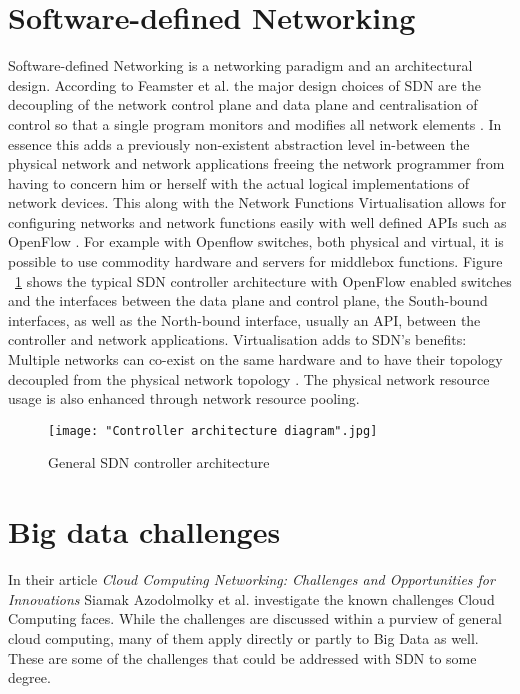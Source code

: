 \documentclass{acm_proc_article-sp}
\begin{document}
\section{Software-defined Networking}

Software-defined Networking is a networking paradigm and an architectural design. According to Feamster et al. the major design choices of SDN are the decoupling of the network control plane and data plane and centralisation of control so that a single program monitors and modifies all network elements \cite{Feamster:2013:RS:2559899.2560327}. In essence this adds a previously non-existent abstraction level in-between the physical network and network applications freeing the network programmer from having to concern him or herself with the actual logical implementations of network devices. This along with the Network Functions Virtualisation allows for configuring networks and network functions easily with well defined APIs such as OpenFlow \cite{McKeown-CCR2008}. For example with Openflow switches, both physical and virtual, it is possible to use commodity hardware and servers for middlebox functions. Figure ~\ref{fig:architecture} shows the typical SDN controller architecture with OpenFlow enabled switches and the interfaces between the data plane and control plane, the South-bound interfaces, as well as the North-bound interface, usually an API, between the controller and network applications. Virtualisation adds to SDN's benefits: Multiple networks can co-exist on the same hardware and to have their topology decoupled from the physical network topology \cite{Azodolmolky}. The physical network resource usage is also enhanced through network resource pooling. 

\begin{figure}[ht!]
\centering
{}
\texttt{[image: "Controller architecture diagram".jpg]}
\caption{General SDN controller architecture}
\label{fig:architecture}
\end{figure} 




\section{Big data challenges}

In their article \textit{Cloud Computing Networking: Challenges and Opportunities for Innovations} \cite{Azodolmolky} Siamak Azodolmolky et al. investigate the known challenges Cloud Computing faces. While the challenges are discussed within a purview of general cloud computing, many of them apply directly or partly to Big Data as well. These are some of the challenges that could be addressed with SDN to some degree.
\end{document}
